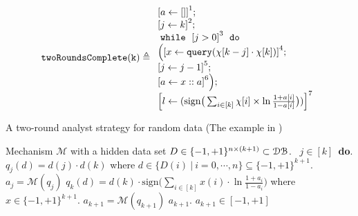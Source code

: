 \begin{example}
        \label{ex:twoRoundsComplete}
        \[
            \kw{twoRoundsComplete(k)} \triangleq
        \begin{array}{l}
               \clabel{ a \leftarrow []}^{1} ; \\
                \clabel{\assign{j}{k} }^{2} ; \\
                \ewhile ~ \clabel{j > 0}^{3} ~ \edo ~ \\
                \Big(
                 \clabel{\assign{x}{\query(\chi[k - j]\cdot \chi[k])} }^{4}  ; \\
                 \clabel{\assign{j}{j-1}}^{5} ;\\
                \clabel{a \leftarrow x :: a}^{6}       \Big);\\
                \clabel{l \leftarrow (\mathrm{sign}\big (\sum_{i\in [k]} \chi[i]\times\ln\frac{1+a[i]}{1-a[i]} \big ))}^{7}\\
            \end{array}
        \]
        \begin{algorithm}
        \footnotesize
        \caption{A two-round analyst strategy for random data (The example in  \cite{dwork2015preserving})}
        \label{alg:twoRound}
        \begin{algorithmic}
        \REQUIRE Mechanism $\mathcal{M}$ with a hidden data set $D \in \{-1,+1\}^{n\times (k+1)} \subset \mathcal{DB}$.
        \ $j\in [k]$\ {\bf do}.  
        \STATE {} $q_j(d)=d(j)\cdot d(k)$ where $d \in \{D(i) ~|~ i = 0, \cdots, n\} \subseteq \{-1,+1\}^{k+1}$.
        \STATE {} $a_j=\mathcal{M}(q_j)$ 
        \STATE \qquad {}
         $q_{k}(d)= d(k) \cdot \mathrm{sign}\big (\sum_{i\in [k]} x(i) \cdot \ln\frac{1+a_i}{1-a_i} \big )$ where $x\in \{-1,+1\}^{k+1}$.
        \STATE{}
         $a_{k+1}=\mathcal{M}(q_{k+1})$
        \STATE{}
        \RETURN $a_{k+1}$.
        \ENSURE $a_{k+1}\in [-1,+1]$
        \end{algorithmic}
        \end{algorithm}
        \end{example}
    
